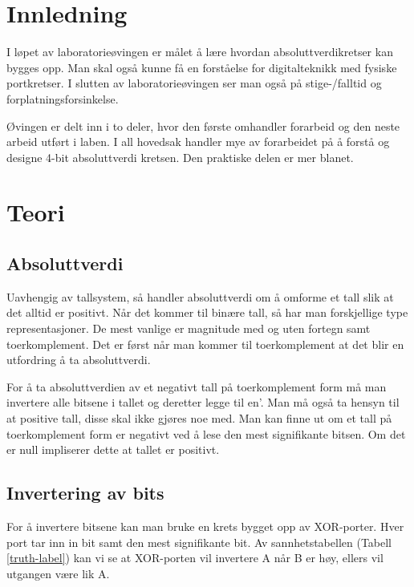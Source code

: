 \documentclass{article}
\begin{document}
\newpage

\tableofcontents{}

\listoffigures

\listoftables

\newpage
{}

\section{Innledning}
I løpet av laboratorieøvingen er målet å lære hvordan absoluttverdikretser kan bygges opp. Man skal også kunne få en forståelse for digitalteknikk med fysiske portkretser. I slutten av laboratorieøvingen ser man også på stige-/falltid og forplatningsforsinkelse.

Øvingen er delt inn i to deler, hvor den første omhandler forarbeid og den neste arbeid utført i laben. I all hovedsak handler mye av forarbeidet på å forstå og designe 4-bit absoluttverdi kretsen. Den praktiske delen er mer blanet.
\section{Teori}
\subsection{Absoluttverdi}
Uavhengig av tallsystem, så handler absoluttverdi om å omforme et tall slik at det alltid er positivt. Når det kommer til binære tall, så har man forskjellige type representasjoner. De mest vanlige er magnitude med og uten fortegn samt toerkomplement. Det er først når man kommer til toerkomplement at det blir en utfordring å ta absoluttverdi.

For å ta absoluttverdien av et negativt tall på toerkomplement form må man invertere alle bitsene i tallet og deretter legge til en’. Man må også ta hensyn til at positive tall, disse skal ikke gjøres noe med. Man kan finne ut om et tall på toerkomplement form er negativt ved å lese den mest signifikante bitsen. Om det er null impliserer dette at tallet er positivt.

\subsection{Invertering av bits}
For å invertere bitsene kan man bruke en krets bygget opp av XOR-porter. Hver port tar inn in bit samt den mest signifikante bit. Av sannhetstabellen (Tabell \ref{truth-label}) kan vi se at XOR-porten vil invertere A når B er høy, ellers vil utgangen være lik A.
\end{document}
